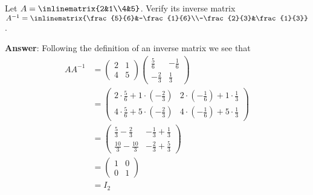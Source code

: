 \begin{exm}
	Let $A=\inlinematrix{2&1\\4&5}$. Verify its
	inverse matrix
	$A^{-1}=\inlinematrix{\frac{5}{6}&-\frac{1}{6}\\-\frac{2}{3}&\frac{1}{3}}$.
	\begin{flushleft}
		\textbf{Answer}: Following the definition of an inverse matrix we see that
		\begin{align*}
			AA^{-1} & = \begin{pmatrix}
				2 & 1 \\
				4 & 5
			\end{pmatrix}\begin{pmatrix}
				\frac{5}{6}  & -\frac{1}{6} \\[4pt]
				-\frac{2}{3} & \frac{1}{3}
			\end{pmatrix} \\
			        & = \begin{pmatrix}
				2\cdot\frac{5}{6}+1\cdot\left(-\frac{2}{3}\right) & 2\cdot\left(-\frac{1}{6}\right)+1\cdot\frac{1}{3} \\[4pt]
				4\cdot\frac{5}{6}+5\cdot\left(-\frac{2}{3}\right) & 4\cdot\left(-\frac{1}{6}\right)+5\cdot\frac{1}{3}
			\end{pmatrix}                          \\
			        & = \begin{pmatrix}
				\frac{5}{3}-\frac{2}{3}   & -\frac{1}{3}+\frac{1}{3} \\[4pt]
				\frac{10}{3}-\frac{10}{3} & -\frac{2}{3}+\frac{5}{3}
			\end{pmatrix}                          \\
			        & = \begin{pmatrix}
				1 & 0 \\
				0 & 1
			\end{pmatrix}                         \\
			        & = I_2
		\end{align*}
	\end{flushleft}
\end{exm}

